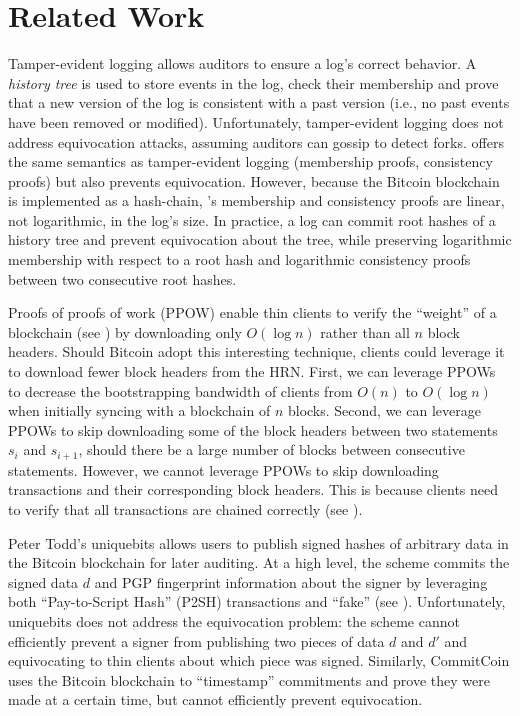 \section{Related Work}
\label{sec:related-work}

Tamper-evident logging\cite{ht} allows auditors to ensure a log's correct behavior.
A \emph{history tree} is used to store events in the log, check their membership and prove that a new version of the log is consistent with a past version (i.e., no past events have been removed or modified).
Unfortunately, tamper-evident logging does not address equivocation attacks, assuming auditors can gossip to detect forks.
\Sys offers the same semantics as tamper-evident logging (\ie membership proofs, consistency proofs) but also prevents equivocation.
However, because the Bitcoin blockchain is implemented as a hash-chain, \Sys's membership and consistency proofs are linear, not logarithmic, in the log's size.
In practice, a \Sys log can commit root hashes of a history tree and prevent equivocation about the tree, while preserving logarithmic membership with respect to a root hash and logarithmic consistency proofs between two consecutive root hashes.

Proofs of proofs of work (PPOW) \cite{ppow} enable thin clients to verify the ``weight'' of a blockchain (see ) by downloading only $O(\log{n})$ rather than all $n$ block headers.
Should Bitcoin adopt this interesting technique, \Sys clients could leverage it to download fewer block headers from the HRN.
First, we can leverage PPOWs to decrease the bootstrapping bandwidth of \Sys clients from $O(n)$ to $O(\log{n})$ when initially syncing with a blockchain of $n$ blocks.
Second, we can leverage PPOWs to skip downloading some of the block headers between two statements $s_i$ and $s_{i+1}$, should there be a large number of blocks between consecutive statements.
However, we cannot leverage PPOWs to skip downloading \Sys transactions and their corresponding block headers.
This is because \Sys clients need to verify that all \Sys transactions are chained correctly (see ).

Peter Todd's uniquebits\cite{uniquebits} allows users to publish signed hashes of arbitrary data in the Bitcoin blockchain for later auditing.
At a high level, the scheme commits the signed data $d$ and PGP fingerprint information about the signer by leveraging both ``Pay-to-Script Hash'' (P2SH) transactions\cite{bitcoin-p2sh-data} and ``fake'' \pks (see ).
Unfortunately, uniquebits does not address the equivocation problem: the scheme cannot efficiently prevent a signer from publishing two pieces of data $d$ and $d'$ and equivocating to thin clients about which piece was signed.
Similarly, CommitCoin\cite{commitcoin} uses the Bitcoin blockchain to ``timestamp'' commitments and prove they were made at a certain time, but cannot efficiently prevent equivocation.

